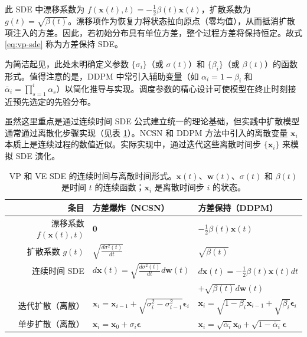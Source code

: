 \documentclass[UTF8,a4paper,zihao=-4,oneside,openany]{ctexbook}
\begin{document}
此 SDE 中漂移系数为 $f(\mathbf{x}(t), t) = -\frac{1}{2} \beta(t) \mathbf{x}(t)$，扩散系数为 $g(t) = \sqrt{\beta(t)}$。漂移项作为恢复力将状态拉向原点（零均值），从而抵消扩散项注入的方差。因此，若初始分布具有单位方差，整个过程方差将保持恒定。故式 \eqref{eq:vp-sde} 称为方差保持 SDE。

为简洁起见，此处未明确定义参数 $\{\sigma_i\}$（或 $\sigma(t)$）和 $\{\beta_i\}$（或 $\beta(t)$）的函数形式。值得注意的是，DDPM 中常引入辅助变量（如 $\alpha_i = 1 - \beta_i$ 和 $\bar{\alpha}_i = \prod_{s=1}^i \alpha_s$）以简化推导与实现。调度参数的精心设计可使模型在终止时刻接近预先选定的先验分布。

虽然这里重点是通过连续时间 SDE 公式建立统一的理论基础，但实践中扩散模型通常通过离散化步骤实现（见表 \ref{tab:vp-and-ve-sdes}）。NCSN 和 DDPM 方法中引入的离散变量 $\mathbf{x}_i$ 本质上是连续过程的数值近似。实际实现中，通过迭代这些离散时间步 $\{\mathbf{x}_i\}$ 来模拟 SDE 演化。

\begin{table}[!t]
\centering
\begingroup
\renewcommand{\arraystretch}{1.3}
\small
\begin{tabular}{r | l | l}
条目 & 方差爆炸（NCSN） & 方差保持（DDPM） \\ \hline
漂移系数 $f(\mathbf{x}(t), t)$ & $\mathbf{0}$ & $-\frac{1}{2} \beta(t) \mathbf{x}(t)$ \\
扩散系数 $g(t)$ & $\sqrt{\frac{d\sigma^2(t)}{dt}}$ & $\sqrt{\beta(t)}$ \\
连续时间 SDE & $d\mathbf{x}(t) = \sqrt{\frac{d\sigma^2(t)}{dt}} d\mathbf{w}(t)$ & $d\mathbf{x}(t) = -\frac{1}{2} \beta(t) \mathbf{x}(t) d t$ \\
& & \hspace{1.25cm} $+ \sqrt{\beta(t)} d\mathbf{w}(t)$ \\ \hline
迭代扩散（离散） & $\mathbf{x}_i = \mathbf{x}_{i-1} + \sqrt{\sigma_i^2 - \sigma_{i-1}^2} \boldsymbol{\epsilon}_i$ & $\mathbf{x}_i = \sqrt{1 - \beta_i} \mathbf{x}_{i-1} + \sqrt{\beta_i} \boldsymbol{\epsilon}_i$ \\
单步扩散（离散） & $\mathbf{x}_i = \mathbf{x}_0 + \sigma_i \boldsymbol{\epsilon}$ & $\mathbf{x}_i = \sqrt{\bar{\alpha}_i} \mathbf{x}_0 + \sqrt{1 - \bar{\alpha}_i} \boldsymbol{\epsilon}$
\end{tabular}
\endgroup
\caption{VP 和 VE SDE 的连续时间与离散时间形式。$\mathbf{x}(t)$、$\mathbf{w}(t)$、$\sigma(t)$ 和 $\beta(t)$ 是时间 $t$ 的连续函数；$\mathbf{x}_i$ 是离散时间步 $i$ 的状态。}
\label{tab:vp-and-ve-sdes}
\end{table}
\end{document}
